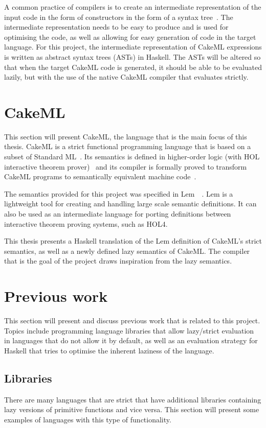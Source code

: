 A common practice of compilers is to create an intermediate representation of
the input code in the form of constructors in the form of a syntax
tree~\cite{DragonBook}. The intermediate representation needs to be
easy to produce and is used for optimising the code, as well as allowing for
easy generation of code in the target language.
For this project, the intermediate representation of CakeML expressions is %
written as abstract syntax trees (ASTs) in Haskell. The ASTs will be altered so
that when the target CakeML code is generated, it should be able to be evaluated
lazily, but with the use of the native CakeML compiler that evaluates strictly.

\section{CakeML}
\label{back:cakeml}
This section will present CakeML, the language that is the main focus of this
thesis. CakeML is a strict functional programming language that is based on a
subset of Standard ML~\cite{CakeML25:online}. Its semantics is defined in
higher-order logic (with HOL interactive theorem prover)~\cite{HOLInter57:online}
and its compiler is formally
proved to transform CakeML programs to semantically equivalent machine
code~\cite{Kumar:2014:CVI:2535838.2535841}.

The semantics provided for this project was specified in
Lem~\cite{Lem33:online}~\cite{LemPaper}. Lem is a lightweight tool for creating
and handling large scale semantic definitions. It can also be used as an
intermediate language for porting definitions between interactive theorem proving
systems, such as HOL4.

This thesis presents a Haskell translation of the Lem definition of CakeML's
strict semantics, as well as a newly defined lazy semantics of CakeML. The
compiler that is the goal of the project draws inspiration from the lazy
semantics.

\section{Previous work}
This section will present and discuss previous work that is related to this
project. Topics include programming language libraries that allow lazy/strict
evaluation in languages that do not allow it by default, as well as an
evaluation strategy for Haskell that tries to optimise the inherent laziness
of the language.

\subsection{Libraries}
There are many languages that are strict that have additional libraries
containing lazy versions of primitive functions and vice versa. This section
will present some examples of languages with this type of functionality.

